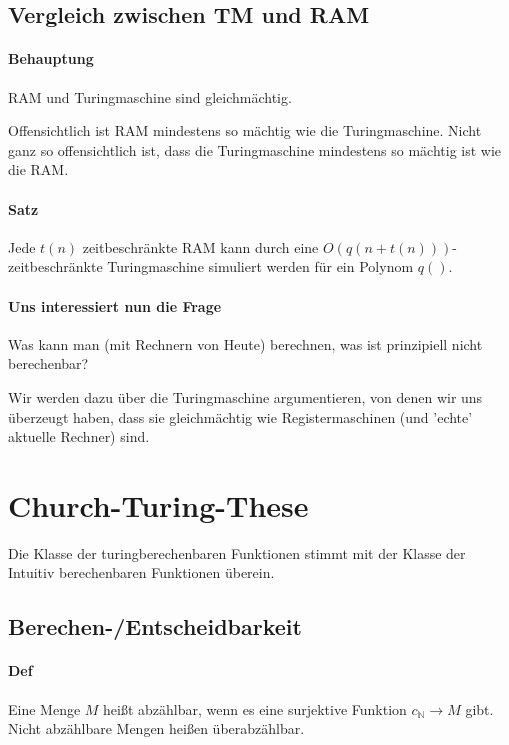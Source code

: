 \subsection{Vergleich zwischen TM und RAM}

\paragraph*{Behauptung} RAM und Turingmaschine sind gleichmächtig.

\para{} Offensichtlich ist RAM mindestens so mächtig wie die Turingmaschine. Nicht ganz so offensichtlich ist, dass die Turingmaschine mindestens so mächtig ist wie die RAM.

\paragraph*{Satz} Jede $t(n)$ zeitbeschränkte RAM kann durch eine $O(q(n+t(n)))$-zeitbeschränkte Turingmaschine simuliert werden für ein Polynom $q()$.

\paragraph*{Uns interessiert nun die Frage} Was kann man (mit Rechnern von Heute) berechnen, was ist prinzipiell nicht berechenbar?

\para{} Wir werden dazu über die Turingmaschine argumentieren, von denen wir uns überzeugt haben, dass sie gleichmächtig wie Registermaschinen (und 'echte' aktuelle Rechner) sind.

\section{Church-Turing-These}

Die Klasse der turingberechenbaren Funktionen stimmt mit der Klasse der Intuitiv berechenbaren Funktionen überein.

\subsection{Berechen-/Entscheidbarkeit}
\paragraph*{Def} Eine Menge $M$ heißt abzählbar, wenn es eine surjektive Funktion $c_\mathbb{N}\rightarrow M$ gibt. Nicht abzählbare Mengen heißen überabzählbar.

